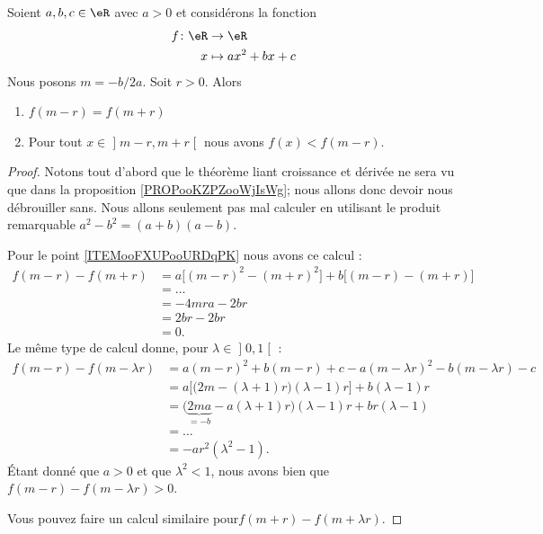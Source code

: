 \begin{proposition}	\label{PROPooVXIQooXmdlWk}
	Soient \( a,b,c\in \eR\) avec \( a>0\) et considérons la fonction
	\begin{equation}
		\begin{aligned}
			f\colon \eR & \to \eR           \\
			x           & \mapsto ax^2+bx+c
		\end{aligned}
	\end{equation}
	Nous posons \( m=-b/2a\). Soit \( r>0\). Alors
	\begin{enumerate}
		\item		\label{ITEMooFXUPooURDqPK}
		      \( f(m-r)=f(m+r)\)
		\item
		      Pour tout \( x\in\mathopen] m-r,m+r\mathclose[\) nous avons \( f(x)<f(m-r)\).
	\end{enumerate}
\end{proposition}

\begin{proof}
	Notons tout d'abord que le théorème liant croissance et dérivée ne sera vu que dans la proposition \ref{PROPooKZPZooWjIsWg}; nous allons donc devoir nous débrouiller sans. Nous allons seulement pas mal calculer en utilisant le produit remarquable \( a^2-b^2=(a+b)(a-b)\).

	Pour le point \ref{ITEMooFXUPooURDqPK} nous avons ce calcul :
	\begin{subequations}
		\begin{align}
			f(m-r)-f(m+r) & =a\Big[  (m-r)^2-(m+r)^2 \Big]+b\Big[ (m-r)-(m+r) \Big] \\
			              & =\ldots                                                 \\
			              & =-4mra-2br                                              \\
			              & =2br-2br                                                \\
			              & =0.
		\end{align}
	\end{subequations}
	Le même type de calcul donne, pour \( \lambda\in\mathopen] 0,1\mathclose[\) :
	\begin{subequations}
		\begin{align}
			f(m-r)-f(m-\lambda r) & =a(m-r)^2+b(m-r)+c-a(m-\lambda r)^2-b(m-\lambda r)-c                        \\
			                      & =a\Big[ \big( 2m-(\lambda+1)r \big)(\lambda -1)r \Big]+b(\lambda-1)r        \\
			                      & =\big( \underbrace{2ma}_{=-b}-a(\lambda+1)r \big)(\lambda-1)r+br(\lambda-1) \\
			                      & =\ldots                                                                     \\
			                      & =-ar^2(\lambda^2-1).
		\end{align}
	\end{subequations}
	Étant donné que \( a>0\) et que \( \lambda^2<1\), nous avons bien que \( f(m-r)-f(m-\lambda r)>0\).

	Vous pouvez faire un calcul similaire pour\( f(m+r)-f(m+\lambda r)\).
\end{proof}
